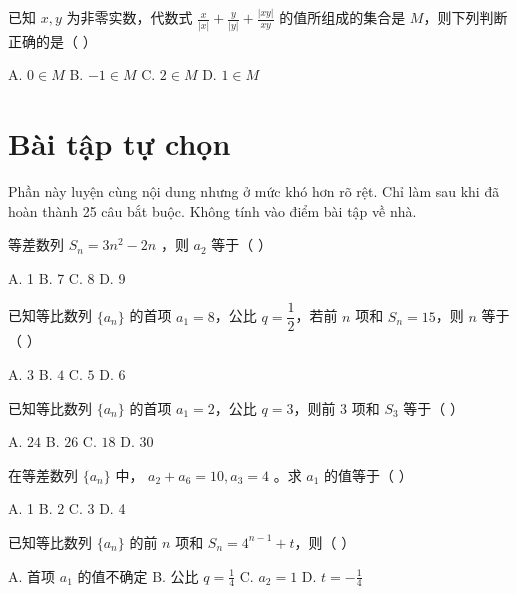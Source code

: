 \documentclass[11pt, a4paper]{article}
\begin{document}
\begin{baitap}[25]
已知 $x, y$ 为非零实数，代数式 $\frac{x}{|x|} + \frac{y}{|y|} + \frac{|xy|}{xy}$ 的值所组成的集合是 $M$，则下列判断正确的是（ ）
\par\vspace{3pt}
\noindent A. $0 \in M$ \quad B. $-1 \in M$ \quad C. $2 \in M$ \quad D. $1 \in M$
\end{baitap}

\clearpage
\section{Bài tập tự chọn}

Phần này luyện cùng nội dung nhưng ở mức khó hơn rõ rệt. Chỉ làm sau khi đã hoàn thành 25 câu bắt buộc. Không tính vào điểm bài tập về nhà.

\begin{baitap}[1]
等差数列 $S_n = 3n^2 - 2n$ ，则 $a_2$ 等于（ ）
\par\vspace{3pt}
\noindent A. 1 \quad B. 7 \quad C. 8 \quad D. 9
\end{baitap}

\begin{baitap}[2]
已知等比数列 $\{a_n\}$ 的首项 $a_1 = 8$，公比 $q = \dfrac{1}{2}$，若前 $n$ 项和 $S_n = 15$，则 $n$ 等于（ ）
\par\vspace{3pt}
\noindent A. $3$ \quad B. $4$ \quad C. $5$ \quad D. $6$
\end{baitap}

\begin{baitap}[3]
已知等比数列 $\{a_n\}$ 的首项 $a_1 = 2$，公比 $q = 3$，则前 $3$ 项和 $S_3$ 等于（ ）
\par\vspace{3pt}
\noindent A. $24$ \quad B. $26$ \quad C. $18$ \quad D. $30$
\end{baitap}

\begin{baitap}[4]
在等差数列 $\{a_n\}$ 中， $a_2 + a_6 = 10, a_3 = 4$ 。求 $a_1$ 的值等于（ ）
\par\vspace{3pt}
\noindent A. 1 \quad B. 2 \quad C. 3 \quad D. 4
\end{baitap}

\begin{baitap}[5]
已知等比数列 $\{a_n\}$ 的前 $n$ 项和 $S_n=4^{n-1}+t$，则（ ）
\par\vspace{3pt}
\noindent A. 首项 $a_1$ 的值不确定 \quad B. 公比 $q=\frac{1}{4}$ \quad C. $a_2=1$ \quad D. $t=-\frac{1}{4}$
\end{baitap}
\end{document}
